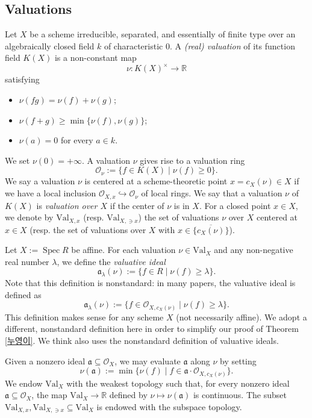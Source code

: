 \documentclass[a4paper,12pt]{amsart}
\theoremstyle{definition} %
\theoremstyle{remark}
\numberwithin{equation}{section}
\newcommand{\R}{\mathbb{R}}
\def\Spec{\operatorname{Spec}}
\begin{document}
\subsection{Valuations}
Let $X$ be a scheme irreducible, separated, and essentially of finite type over an algebraically closed field $k$ of characteristic $0$. A \emph{(real) valuation} of its function field $K(X)$ is a non-constant map
$$ \nu:K(X)^{\times}\to \R $$
satisfying
\begin{itemize}
    \item $\nu(fg)=\nu(f)+\nu(g)$;
    \item $\nu(f+g)\ge \min\{\nu(f),\nu(g)\}$;
    \item $\nu(a)=0$ for every $a\in k$.
\end{itemize}
We set $\nu(0)=+\infty$. A valuation $\nu$ gives rise to a valuation ring
$$ \mathcal{O}_{\nu}:=\{f\in K(X)\mid \nu(f)\ge 0\}.$$
We say a valuation $\nu$ is centered at a scheme-theoretic point $x=c_X(\nu)\in X$ if we have a local inclusion $\mathcal{O}_{X,x}\hookrightarrow \mathcal{O}_{\nu}$ of local rings. We say that a valuation $\nu$ of $K(X)$ is \emph{valuation over $X$} if the center of $\nu$ is in $X$. For a closed point $x\in X$, we denote by $\mathrm{Val}_{X,x}$ (resp. $\mathrm{Val}_{X,\ni x}$) the set of valuations $\nu$ over $X$ centered at $x\in X$ (resp. the set of valuations over $X$ with $x\in \overline{\{c_X(\nu)\}}$).

\smallskip

Let $X:=\Spec R$ be affine. For each valuation $\nu\in \mathrm{Val}_{X}$ and any non-negative real number $\lambda$, we define the \emph{valuative ideal}
$$ \mathfrak{a}_{\lambda}(\nu):=\{f\in R\mid \nu(f)\ge \lambda\}.$$
Note that this definition is nonstandard: in many papers, the valuative ideal is defined as
$$ \mathfrak{a}_{\lambda}(\nu):=\{f\in \mathcal{O}_{X,c_X(\nu)}\mid \nu(f)\ge \lambda\}. $$
 This definition makes sense for any scheme $X$ (not necessarily affine). We adopt a different, nonstandard definition here in order to simplify our proof of Theorem \ref{누영이}. We think \cite{LX20} also uses the nonstandard definition of valuative ideals.

\smallskip

Given a nonzero ideal $\mathfrak{a}\subseteq \mathcal{O}_X$, we may evaluate $\mathfrak{a}$ along $\nu$ by setting
$$ \nu(\mathfrak{a}):=\min\{\nu(f)\mid f\in \mathfrak{a}\cdot \mathcal{O}_{X,c_X(\nu)}\}. $$
We endow $\mathrm{Val}_X$ with the weakest topology such that, for every nonzero ideal $\mathfrak{a}\subseteq \mathcal{O}_X$, the map $\mathrm{Val}_X\to \R$ defined by $\nu\mapsto \nu(\mathfrak{a})$ is continuous. The subset $\mathrm{Val}_{X,x},\mathrm{Val}_{X,\ni x}\subseteq \mathrm{Val}_X$ is endowed with the subspace topology.
\end{document}
